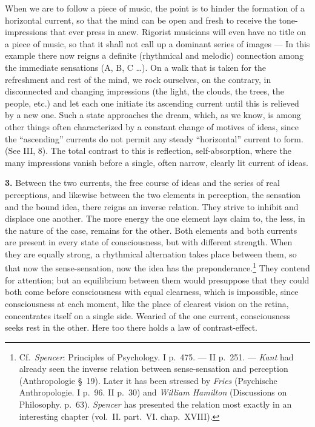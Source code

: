 \documentclass[12pt,a4paper]{book}
\newcommand{\opage}[1]{\marginnote{\footnotesize\textit{[#1]}}}
\begin{document}
When we are to follow a piece of music, the point is to hinder
the formation of a horizontal current, so that the mind can be open and
fresh to receive the tone-impressions that ever press in anew. Rigorist
musicians will even have no title on a piece of music, so that it shall
not call up a dominant series of images --- In this example there now
reigns a definite (rhythmical and melodic) connection among the immediate
sensations (A, B, C \ldots). On a walk that is taken for the refreshment
and rest of the mind, we rock ourselves, on the contrary, in disconnected
and changing impressions (the light, the clouds, the trees, the people,
etc.) and let each one initiate its ascending current until this is
relieved by a new one. Such a state approaches the dream, which, as we
know, is among other things often characterized by a constant change of
motives of ideas, since the ``ascending'' currents do not permit any
steady ``horizontal'' current to form. (See III, 8). The total contrast
to this is reflection, self-absorption, where the many impressions vanish
before a single, often narrow, clearly lit current of ideas.

\textbf{3.} Between the two currents, the free course of ideas and the
series of real perceptions, and likewise between the two elements in
perception, the sensation and the bound idea, there reigns an inverse
relation. They strive to inhibit and displace one another. The more energy
the one element lays claim to, the less, in the nature of the case,
remains for the other. Both elements and both currents are present in
every state of consciousness, but with different strength. When they are
equally strong, a rhythmical alternation takes place between them, so that
now the sense-sensation,
\opage{158}now the idea has the preponderance.\footnote{Cf.\
\emph{Spencer}: Principles of Psychology. I p.~475. --- II p.~251. ---
\emph{Kant} had already seen the inverse relation between sense-sensation
and perception (Anthropologie \S~19). Later it has been stressed by
\emph{Fries} (Psychische Anthropologie. I p.~96. II p.~30) and
\emph{William Hamilton} (Discussions on Philosophy. p.~63).
\emph{Spencer} has presented the relation most exactly in an interesting
chapter (vol.~II. part.~VI. chap.~XVIII).} They contend for attention;
but an equilibrium between them would presuppose that they could both come
before consciousness with equal clearness, which is impossible, since
consciousness at each moment, like the place of clearest vision on the
retina, concentrates itself on a single side. Wearied of the one current,
consciousness seeks rest in the other. Here too there holds a law of
contrast-effect.
\end{document}
